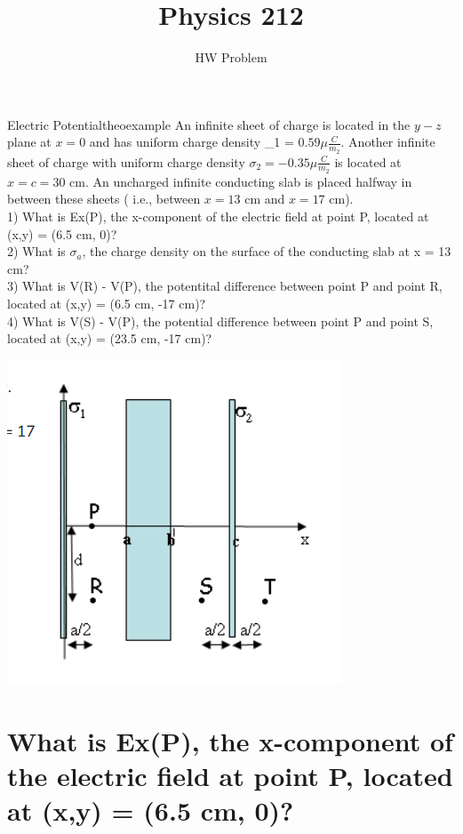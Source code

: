 \documentclass{article}
\title{Physics 212}
\date{\vspace{-5ex}}
\author{HW Problem}
\begin{document}
\maketitle

\begin{mytheo}{Electric Potential}{theoexample}
	An infinite sheet of charge is located in the $y-z$ plane at $x = 0$ and has uniform charge density \sigma_{1} = $0.59 \mu \frac{C}{m_2}$. Another infinite sheet of charge with uniform charge density $\sigma_2 = -0.35 \mu \frac{C}{m_2}$ is located at $x = c = 30$ cm. An uncharged infinite conducting slab is placed halfway in between these sheets ( i.e., between $x = 13$ cm and $x = 17$ cm).\\

1)
What is Ex(P), the x-component of the electric field at point P, located at (x,y) = (6.5 cm, 0)? \\

2)
What is $\sigma_{a}$, the charge density on the surface of the conducting slab at x = 13 cm? \\

3) What is V(R) - V(P), the potentital difference between point P and point R, located at (x,y) = (6.5 cm, -17 cm)?\\

4) What is V(S) - V(P), the potential difference between point P and point S, located at (x,y) = (23.5 cm, -17 cm)?
\end{mytheo}
\includegraphics{sadge.png}

\section{What is Ex(P), the x-component of the electric field at point P, located at (x,y) = (6.5 cm, 0)?}
\end{document}
